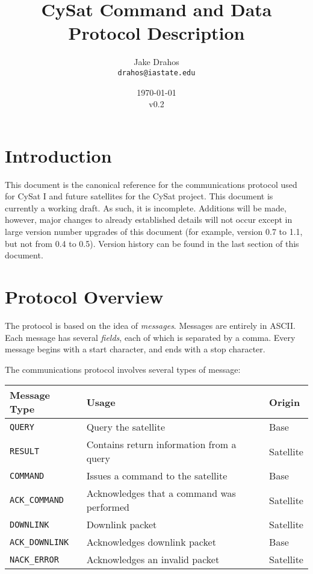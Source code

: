 \documentclass{article}
\begin{document}
\title{CySat Command and Data Protocol Description}
\author{Jake Drahos \\ \texttt{drahos@iastate.edu}}
\date{\today\\v0.2}


\newcommand{\mquery}{\texttt{QUERY }}
\newcommand{\mresult}{\texttt{RESULT }}
\newcommand{\mcommand}{\texttt{COMMAND }}
\newcommand{\mdownlink}{\texttt{DOWNLINK }}
\newcommand{\macommand}{\texttt{ACK\_COMMAND }}
\newcommand{\madownlink}{\texttt{ACK\_DOWNLINK }}
\newcommand{\merror}{\texttt{NACK\_ERROR }}


\maketitle

\section{Introduction}
This document is the canonical reference for the communications protocol used for CySat I and
future satellites for the CySat project.
This document is currently a working draft. As such, it is incomplete. Additions will be made, however, major
changes to already established details will not occur except in large version number upgrades of this document (for example,
version 0.7 to 1.1, but not from 0.4 to 0.5).
Version history can be found in the last section of this document.

\section{Protocol Overview}
The protocol is based on the idea of \emph{messages}.
Messages are entirely in ASCII.
Each message has several \emph{fields}, each of which is separated by a comma.
Every message begins with a start character, and ends with a stop character.

The communications protocol involves several types of message:
\begin{center}
  \begin{tabular}{| l | l | l |}
    \hline
    Message Type & Usage & Origin \\ \hline
    \mquery & Query the satellite & Base \\
    \mresult & Contains return information from a query & Satellite \\ \hline
    \mcommand & Issues a command to the satellite & Base \\
    \macommand & Acknowledges that a command was performed & Satellite \\ \hline
    \mdownlink & Downlink packet & Satellite \\
    \madownlink & Acknowledges downlink packet & Base \\ \hline
    \merror & Acknowledges an invalid packet & Satellite \\
    \hline
  \end{tabular}
\end{center}
  
\end{document}
